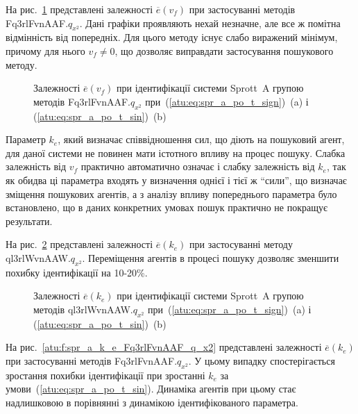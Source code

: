 На рис.~\ref{atu:f:spr_a_v_f_Fq3rlFvnAAF_q_x2} представлені залежності
$\overline{e}(v_f)$ при застосуванні методів Fq3rlFvnAAF.$q_{x^2}$. Дані графіки проявляють нехай незначне, але все ж
помітна відмінність від попередніх. Для цього методу існує
слабо виражений мінімум, причому для нього
$v_f \ne 0$, що дозволяє виправдати застосування пошукового методу.

\begin{figure}[htb!]
  \caption{Залежності $\overline{e}(v_f)$ при ідентифікації системи Sprott~A групою методів Fq3rlFvnAAF.$q_{x^2}$ при~(\ref{atu:eq:spr_a_po_t_sign})~(a) і (\ref{atu:eq:spr_a_po_t_sin})~(b)}
  \label{atu:f:spr_a_v_f_Fq3rlFvnAAF_q_x2}
\end{figure}

Параметр
$k_e$, який визначає співвідношення сил, що діють на пошуковий
агент, для даної системи не повинен мати істотного впливу на
процес пошуку. Слабка залежність від
$v_f$ практично автоматично означає і слабку залежність від
$k_e$, так як обидва ці параметра входять у визначення однієї
і тієї ж ``сили'', що визначає зміщення пошукових агентів, а з
аналізу впливу попереднього параметра було встановлено, що в
даних конкретних умовах пошук практично не покращує результати.


На рис.~\ref{atu:f:spr_a_k_e_ql3rlWvnAAW_q_x2} представлені залежності
$\overline{e} (k_e)$ при застосуванні методу ql3rlWvnAAW.$q_{x^2}$. Переміщення агентів в процесі пошуку дозволяє зменшити
похибку ідентифікації на 10-20\%.

\begin{figure}[htb!]
  \caption{Залежності $\overline{e} (k_e)$ при ідентифікації системи Sprott~A групою методів ql3rlWvnAAW.$q_{x^2}$ при~(\ref{atu:eq:spr_a_po_t_sign})~(a) і (\ref{atu:eq:spr_a_po_t_sin})~(b)}
  \label{atu:f:spr_a_k_e_ql3rlWvnAAW_q_x2}
\end{figure}

На рис.~\ref{atu:f:spr_a_k_e_Fq3rlFvnAAF_q_x2} представлені залежності
$\overline{e} (k_e)$ при застосуванні методів
Fq3rlFvnAAF.$q_{x^2}$.
У цьому випадку спостерігається зростання похибки
ідентифікації при зростанні
$k_e$ за умови~(\ref{atu:eq:spr_a_po_t_sin}). Динаміка агентів при цьому
стає надлишковою в порівнянні з динамікою ідентифікованого
параметра.

